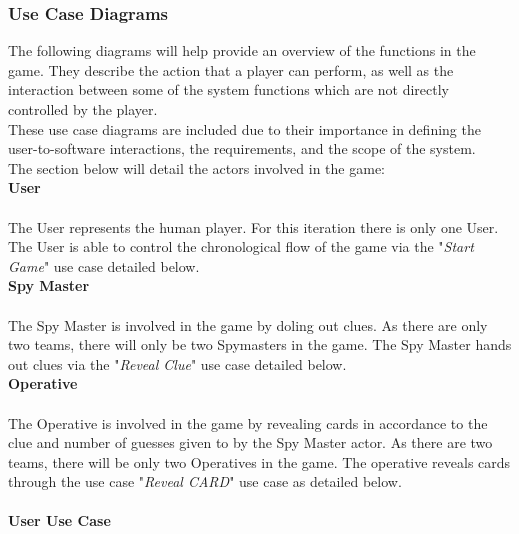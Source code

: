 \documentclass[10pt, a4paper]{article}
\begin{document}
		\subsubsection{Use Case Diagrams}
		
		The following diagrams will help provide an overview of the functions in the game. They describe the action that a player can perform, as well as the interaction between some of the system functions which are not directly controlled by the player.\\
		
		These use case diagrams are included due to their importance in defining the user-to-software interactions, the requirements, and the scope of the system.\\
		
		The section below will detail the actors involved in the game: \\
		    
		    \textbf{User} \\
		    \\
		    The User represents the human player. For this iteration there is only one User. The User is able to control the chronological flow of the game via the "\textit{Start Game}" use case detailed below.\\
		    
		    \textbf{Spy Master}\\
		    \\
		    The Spy Master is involved in the game by doling out clues. As there are only two teams, there will only be two Spymasters in the game. The Spy Master hands out clues via the "\textit{Reveal Clue}" use case detailed below.\\
		    
		    \textbf{Operative}\\
		    \\
		    The Operative is involved in the game by revealing cards in accordance to the clue and number of guesses given to by the Spy Master actor. As there are two teams, there will be only two Operatives in the game. The operative reveals cards through the use case "\textit{Reveal CARD}" use case as detailed below.\\
		    
		    \clearpage
		
			\paragraph{User Use Case}
			
\end{document}

